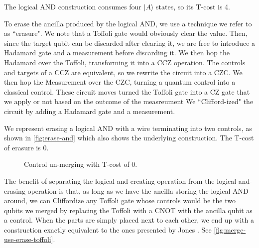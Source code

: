 \documentclass[twocolumn,longbibliography]{quantumarticle-customized}
\newcommand{\qH}{\gate{H}}
\begin{document}
The logical AND construction consumes four $|A\rangle$ states, so its T-cost is 4.

To erase the ancilla produced by the logical AND, we use a technique we refer to as ``erasure".
We note that a Toffoli gate would obviously clear the value.
Then, since the target qubit can be discarded after clearing it, we are free to introduce a Hadamard gate and a measurement before discarding it.
We then hop the Hadamard over the Toffoli, transforming it into a CCZ operation.
The controls and targets of a CCZ are equivalent, so we rewrite the circuit into a CZC.
We then hop the Measurement over the CZC, turning a quantum control into a classical control.
These circuit moves turned the Toffoli gate into a CZ gate that we apply or not based on the outcome of the measreument
We ``Clifford-ized" the circuit by adding a Hadamard gate and a measurement.

We represent erasing a logical AND with a wire terminating into two controls, as shown in \autoref{fig:erase-and} which also shows the underlying construction.
The T-cost of erasure is 0.

\begin{figure}
  \resizebox{\linewidth}{!}{
    \Qcircuit @R=1.5em @C=0.7em {
      &x  &&\ctrl{1} &\qw &x && &&\qw &\qw    &\ctrl{1} &\qw \\
      &y  &&\ctrl{1} &\qw &y &&=&&\qw &\qw    &\gate{Z} &\qw \\
      &xy &&\qw      &    &  && &&\qH &\meter &\cw \cwx \bullet &    \\
    }
  }
  \caption{
	Control un-merging with T-cost of 0.
  }
  \label{fig:erase-and}
\end{figure}

The benefit of separating the logical-and-creating operation from the logical-and-erasing operation is that, as long as we have the ancilla storing the logical AND around, we can Cliffordize any Toffoli gate whose controls would be the two qubits we merged by replacing the Toffoli with a CNOT with the ancilla qubit as a control.
When the parts are simply placed next to each other, we end up with a construction exactly equivalent to the ones presented by Jones \cite{Jones2013}.
See \autoref{fig:merge-use-erase-toffoli}.
\end{document}
